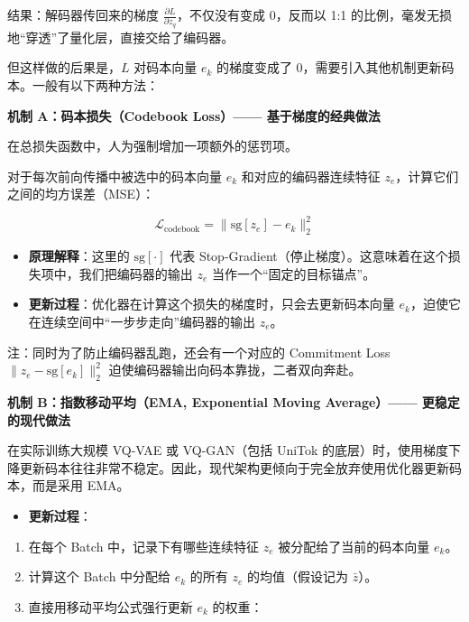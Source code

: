 结果：解码器传回来的梯度 \(\frac{\partial L}{\partial z_q}\)，不仅没有变成 0，反而以 1:1 的比例，毫发无损地``穿透''了量化层，直接交给了编码器。

但这样做的后果是，\(L\) 对码本向量 \(e_k\) 的梯度变成了 0，需要引入其他机制更新码本。一般有以下两种方法：

\textbf{机制 A：码本损失（Codebook Loss）------ 基于梯度的经典做法}

在总损失函数中，人为强制增加一项额外的惩罚项。

对于每次前向传播中被选中的码本向量 \(e_k\) 和对应的编码器连续特征 \(z_e\)，计算它们之间的均方误差（MSE）：

\[
\mathcal{L}_{\mathrm{codebook}}
=\lVert \mathrm{sg}[z_e]-e_k\rVert_2^2
\]

\begin{itemize}
\tightlist
\item
  \textbf{原理解释}：这里的 \(\mathrm{sg}[\cdot]\) 代表 Stop-Gradient（停止梯度）。这意味着在这个损失项中，我们把编码器的输出 \(z_e\) 当作一个``固定的目标锚点''。
\item
  \textbf{更新过程}：优化器在计算这个损失的梯度时，只会去更新码本向量 \(e_k\)，迫使它在连续空间中``一步步走向''编码器的输出 \(z_e\)。
\end{itemize}

注：同时为了防止编码器乱跑，还会有一个对应的 Commitment Loss \(\lVert z_e-\mathrm{sg}[e_k]\rVert_2^2\) 迫使编码器输出向码本靠拢，二者双向奔赴。

\textbf{机制 B：指数移动平均（EMA, Exponential Moving Average）------ 更稳定的现代做法}

在实际训练大规模 VQ-VAE 或 VQ-GAN（包括 UniTok 的底层）时，使用梯度下降更新码本往往非常不稳定。因此，现代架构更倾向于完全放弃使用优化器更新码本，而是采用 EMA。

\begin{itemize}
\tightlist
\item
  \textbf{更新过程}：
\end{itemize}

\begin{enumerate}
\def\labelenumi{\arabic{enumi}.}
\tightlist
\item
  在每个 Batch 中，记录下有哪些连续特征 \(z_e\) 被分配给了当前的码本向量 \(e_k\)。
\item
  计算这个 Batch 中分配给 \(e_k\) 的所有 \(z_e\) 的均值（假设记为 \(\bar z\)）。
\item
  直接用移动平均公式强行更新 \(e_k\) 的权重：
\end{enumerate}

